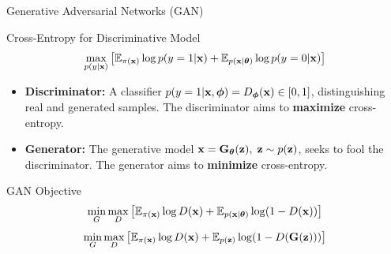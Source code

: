 \documentclass{beamer}
\begin{document}
\begin{frame}{Generative Adversarial Networks (GAN)}
	\begin{block}{Cross-Entropy for Discriminative Model}
		\vspace{-0.3cm}
		\[
			\max_{p(y | \mathbf{x})} \left[\mathbb{E}_{\pi(\mathbf{x})} \log p(y = 1 | \mathbf{x}) + \mathbb{E}_{p(\mathbf{x} | \boldsymbol{\theta})} \log p(y = 0 | \mathbf{x}) \right] 
		\]
	\end{block}
	\begin{itemize}
		\item \textbf{Discriminator:} A classifier $p(y = 1 | \mathbf{x}, \boldsymbol{\phi}) = D_{\boldsymbol{\phi}}(\mathbf{x}) \in [0, 1]$, distinguishing real and generated samples. The discriminator aims to \textbf{maximize} cross-entropy.
		\item \textbf{Generator:} The generative model $\mathbf{x} = \mathbf{G}_{\boldsymbol{\theta}}(\mathbf{z}),\; \mathbf{z} \sim p(\mathbf{z})$, seeks to fool the discriminator. The generator aims to \textbf{minimize} cross-entropy.
	\end{itemize}
	\begin{block}{GAN Objective}
		\vspace{-0.5cm}
		\[
			\min_{G} \max_D \left[ \mathbb{E}_{\pi(\mathbf{x})} \log D(\mathbf{x}) + \mathbb{E}_{p(\mathbf{x} | \boldsymbol{\theta})} \log (1 - D(\mathbf{x})) \right] 
		\]
		\[
			\min_{G} \max_D \left[ \mathbb{E}_{\pi(\mathbf{x})} \log D(\mathbf{x}) + \mathbb{E}_{p(\mathbf{z})} \log (1 - D(\mathbf{G}(\mathbf{z}))) \right]
		\]
	\end{block}
\end{frame}
\end{document}
